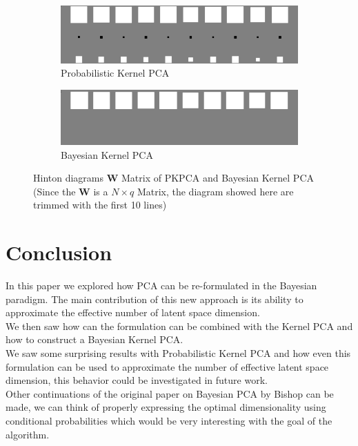 \documentclass{article}
\begin{document}
\begin{figure}[ht]
    \centering
    \begin{subfigure}{.5\textwidth}
      \centering
      \includegraphics[width=.8\linewidth]{img/hinton_pkpca.png}
      \caption{Probabilistic Kernel PCA}
      \label{fig:pkpca_hinton}
    \end{subfigure}%
    \begin{subfigure}{.5\textwidth}
      \centering
      \includegraphics[width=.8\linewidth]{img/hinton_bkpca.png}
      \caption{Bayesian Kernel PCA}
      \label{fig:bayesk_hinton}
    \end{subfigure}
    \caption{Hinton diagrams $\mathbf{W}$ Matrix of PKPCA and Bayesian Kernel PCA (Since the $\mathbf{W}$ is a $N \times q$ Matrix, the diagram showed here are trimmed with the first 10 lines)}
    \label{fig:hinton_kpca}
\end{figure}

\section{Conclusion}

In this paper we explored how PCA can be re-formulated in the Bayesian paradigm. The main contribution of this new approach is its ability to approximate the effective number of latent space dimension.\\
We then saw how can the formulation can be combined with the Kernel PCA and how to construct a Bayesian Kernel PCA.\\

We saw some surprising results with Probabilistic Kernel PCA and how even this formulation can be used to approximate the number of effective latent space dimension, this behavior could be investigated in future work.\\

Other continuations of the original paper on Bayesian PCA by Bishop can be made, we can think of properly expressing the optimal dimensionality using conditional probabilities which would be very interesting with the goal of the algorithm.


\end{document}
